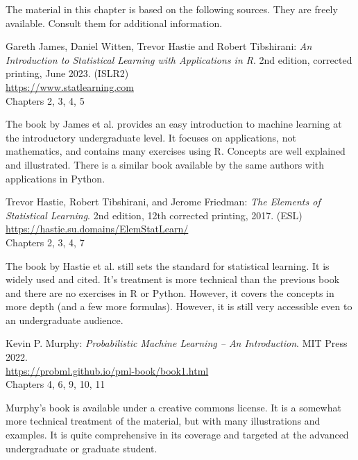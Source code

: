 The material in this chapter is based on the following sources. They are freely available. Consult them for additional information.

\begin{resourcebox}
Gareth James, Daniel Witten, Trevor Hastie and Robert Tibshirani: \emph{An Introduction to Statistical Learning with Applications in R}. 2nd edition, corrected printing, June 2023. (ISLR2) \\

\url{https://www.statlearning.com} \\

Chapters 2, 3, 4, 5
\end{resourcebox}

The book by James et al. provides an easy introduction to machine learning at the introductory undergraduate level. It focuses on applications, not mathematics, and contains many exercises using R. Concepts are well explained and illustrated. There is a similar book available by the same authors with applications in Python. 

\begin{resourcebox}
Trevor Hastie, Robert Tibshirani, and Jerome Friedman: \emph{The Elements of Statistical Learning}. 2nd edition, 12th corrected printing, 2017. (ESL) \\

\url{https://hastie.su.domains/ElemStatLearn/} \\

Chapters 2, 3, 4, 7
\end{resourcebox}

The book by Hastie et al. still sets the standard for statistical learning. It is widely used and cited. It's treatment is more technical than the previous book and there are no exercises in R or Python. However, it covers the concepts in more depth (and a few more formulas). However, it is still very accessible even to an undergraduate audience.

\begin{resourcebox}
Kevin P. Murphy: \emph{Probabilistic Machine Learning -- An Introduction}. MIT Press 2022. \\

\url{https://probml.github.io/pml-book/book1.html} \\

Chapters 4, 6, 9, 10, 11
\end{resourcebox}

Murphy's book is available under a creative commons license. It is a somewhat more technical treatment of the material, but with many illustrations and examples. It is quite comprehensive in its coverage and targeted at the advanced undergraduate or graduate student. 

